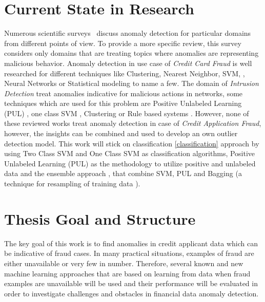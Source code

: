 \section{Current State in Research}\label{state-of-the-art}
Numerous scientific surveys~\cite{Agyemang:2006:CSN:1609942.1609946,Chandola:2009:ADS:1541880.1541882,Chandola:2012:ADD:2197072.2197116,Pimentel:2014:RRN:2588908.2589196} discuss anomaly detection for particular domains from different points of view. To provide a more specific review, this survey considers only domains that are treating topics where anomalies are representing malicious behavior. Anomaly detection in use case of \textit{Credit Card Fraud} is well researched for different techniques like Clustering, Nearest Neighbor, SVM, \cite{Eskin:2010}, Neural Networks \cite{Ghosh;Reilly;1994} or Statistical modeling \cite{Agarwal:2005} to name a few. The domain of \textit{Intrusion Detection} treat anomalies indicative for malicious actions in networks, some techniques which are used for this problem are Positive Unlabeled Learning (PUL) \cite{Eskin:2010}, one class SVM \cite{Amer:2013:EOS:2500853.2500857}, Clustering \cite{Chandola:2006} or Rule based systems \cite{Salvador:2005}. However, none of these reviewed works treat anomaly detection in case of \textit{Credit Application Fraud}, however, the insights can be combined and used to develop an own outlier detection model. 
This work will stick on classification \ref{classification} approach by using Two Class SVM \cite{Cortes;Vapnik:1995} and One Class SVM \cite{Tax:2004:SVD:960091.960109} as classification algorithms, Positive Unlabeled Learning (PUL) \cite{Elkan;Noto:2008} as the methodology to utilize positive and unlabeled data and the ensemble approach \cite{journals/prl/MordeletV14}, that combine SVM, PUL and Bagging (a technique for resampling of training data \cite{breiman:ml96}).



\section{Thesis Goal and Structure}\label{goalandstructure}
The key goal of this work is to find anomalies in credit applicant data which can be indicative of fraud cases. In many practical situations, examples of fraud are either unavailable or very few in number. Therefore, several known and new machine learning approaches that are based on learning from data when fraud examples are unavailable will be used and their performance will be evaluated in order to investigate challenges and obstacles in financial data anomaly detection.


